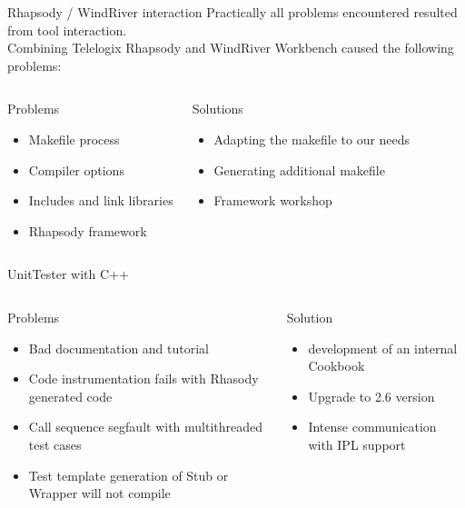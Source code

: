 \documentclass{beamer}
\begin{document}
\begin{frame}{Rhapsody / WindRiver interaction}
Practically all problems encountered resulted from tool interaction.\\
Combining Telelogix Rhapsody and WindRiver Workbench caused the following 
problems:
\begin{columns}
    \begin{block}{Problems}
      \begin{itemize}
      \item Makefile process
      \item Compiler options
      \item Includes and link libraries
      \item Rhapsody framework
      \end{itemize}
    \end{block}

    \begin{block}{Solutions}
      \begin{itemize}
      \item Adapting the makefile to our needs
      \item Generating additional makefile
      \item Framework workshop
      \end{itemize}
    \end{block}
\end{columns}
\end{frame}

\begin{frame}{UnitTester with C++}

\begin{columns}

\begin{block}{Problems}
  \begin{itemize}
  \item Bad documentation and tutorial
  \item Code instrumentation fails with Rhasody generated code
  \item Call sequence segfault with multithreaded test cases
  \item Test template generation of Stub or Wrapper will not compile
  \end{itemize}
\end{block}

\begin{block}{Solution}
  \begin{itemize}
  \item development of an internal Cookbook
  \item Upgrade to 2.6 version
  \item Intense communication with IPL support
  \end{itemize}
\end{block}
\end{columns}
\end{frame}
\end{document}
